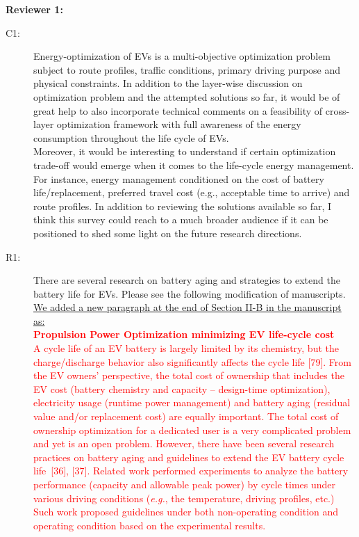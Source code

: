 \documentclass[onecolumn]{IEEEconf}
\begin{document}
\setlength{\parindent}{0cm}
\textbf{Reviewer 1:}
\begin{description}
\item [C1: ] Energy-optimization of EVs is a multi-objective optimization problem subject to route profiles, traffic conditions, primary driving purpose and physical constraints. In addition to the layer-wise discussion on optimization problem and the attempted solutions so far, it would be of great help to also incorporate technical comments on a feasibility of cross-layer optimization framework with full awareness of the energy consumption throughout the life cycle of EVs.\\ 
Moreover, it would be interesting to understand if certain optimization trade-off would emerge when it comes to the life-cycle energy management. For instance, energy management conditioned on the cost of battery life/replacement, preferred travel cost (e.g., acceptable time to arrive) and route profiles. In addition to reviewing  the solutions available so far, I think this survey could reach to a much broader audience if it can be positioned to shed some light on the future research directions.
\item [R1: ] There are several research on battery aging and strategies to extend the battery life for EVs.  Please see the following modification of manuscripts.\\

\underline{We added a new paragraph at the end of Section II-B in the manuscript as:}\\
\textcolor{red}{
\textbf{Propulsion Power Optimization minimizing EV life-cycle cost}\\
A cycle life of an EV battery is largely limited by its chemistry, but the charge/discharge behavior also significantly affects the cycle life [79]. From the EV owners' perspective, the total cost of ownership that includes the EV cost (battery chemistry and capacity -- design-time optimization), electricity usage (runtime power management) and battery aging (residual value and/or replacement cost) are equally important. The total cost of ownership optimization for a dedicated user is a very complicated problem and yet is an open problem. 
%
However, there have been several research practices on battery aging and guidelines to extend the EV battery cycle life~[36], [37]. Related work performed experiments to analyze the battery performance (capacity and allowable peak power) by cycle times under various driving conditions (\textit{e.g.}, the temperature, driving profiles, etc.) Such work proposed guidelines under both non-operating condition and operating condition based on the experimental results.}


\end{description}
\end{document}
